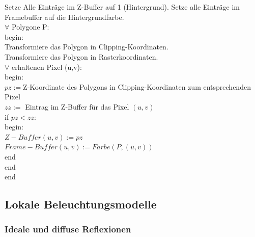 \begin{Algorithmus}
Setze Alle Einträge im Z-Buffer auf 1 (Hintergrund).
Setze alle Einträge im Framebuffer auf die Hintergrundfarbe. \\
$\forall$ Polygone P: \\
begin: \\
Transformiere das Polygon in Clipping-Koordinaten. \\
Transformiere das Polygon in Rasterkoordinaten. \\
$\forall$ erhaltenen Pixel (u,v): \\
begin: \\
$pz := $Z-Koordinate des Polygons in Clipping-Koordinaten zum entsprechenden Pixel \\
$zz:=$ Eintrag im Z-Buffer für das Pixel $(u,v)$ \\
if $pz < zz$: \\
begin: \\
$Z-Buffer(u,v) := pz$ \\
$Frame-Buffer(u,v) := Farbe(P,(u,v))$ \\
end \\
end \\
end
\end{Algorithmus}


\subsection{Lokale Beleuchtungsmodelle}
\subsubsection{Ideale und diffuse Reflexionen}
